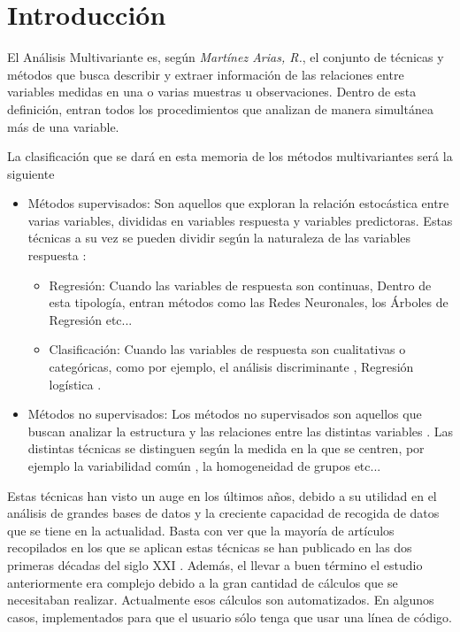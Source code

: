 \chapter*{Introducción}
\noindent El Análisis Multivariante es, según \textit{Martínez Arias, R.}\cite{Rosario 1999}, el conjunto de técnicas y métodos que busca describir y extraer información de las relaciones entre variables medidas en una o varias muestras u observaciones. Dentro de esta definición, entran todos los procedimientos que analizan de manera simultánea más de una variable. 

\noindent La clasificación que se dará en esta memoria de los métodos multivariantes será la siguiente 
\begin{itemize}
\item Métodos supervisados: Son aquellos que exploran la relación estocástica entre varias variables, divididas en variables respuesta y variables predictoras. Estas técnicas a su vez se pueden dividir según la naturaleza de las variables respuesta \cite{James 2013}:
\begin{itemize}
\item Regresión:  Cuando las variables de respuesta son continuas, Dentro de esta tipología, entran métodos como las  Redes Neuronales\cite{Mamidi 2021}, los Árboles  de Regresión \cite{Nerini 2007} etc...
\item Clasificación: Cuando las variables de respuesta son cualitativas o categóricas, como por ejemplo, el análisis discriminante \cite{Diez 2002}, Regresión logística \cite{Ensum 2005}.
\end{itemize}
\item Métodos no supervisados:  Los métodos no supervisados son aquellos que buscan analizar la estructura y las relaciones entre las distintas variables \cite{Hastie 2001}. Las distintas técnicas se distinguen según la medida en la que se centren, por ejemplo la variabilidad común \cite{Pages 2005}, la homogeneidad de grupos \cite{Okazaki 2006} etc...
\end{itemize}

\noindent Estas técnicas han visto un auge en los últimos años, debido a su utilidad en el análisis de grandes bases de datos y la creciente capacidad de recogida de datos que se tiene en la actualidad. Basta con ver que la mayoría de artículos recopilados en los que se aplican estas técnicas se han publicado en las dos primeras décadas del siglo XXI \cite{Diaz 2006, Galindo 2015,Diez 2002, Echeverri 2015}. Además, el llevar a buen término el estudio anteriormente era complejo debido a la gran cantidad de cálculos que se necesitaban realizar. Actualmente esos cálculos son automatizados. En algunos casos, implementados para que el usuario sólo tenga que usar una línea de código.

